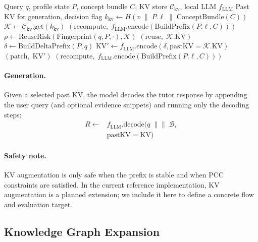 \documentclass[11pt,a4paper,twocolumn]{article}
\begin{document}
\begin{algorithm}[h]
\caption{KVReuseOrRecompute (Proposed)}
\label{alg:kv_reuse}
\footnotesize
\begin{algorithmic}[1]
\REQUIRE Query $q$, profile state $P$, concept bundle $C$, KV store $\mathcal{C}_{\text{kv}}$, local LLM $f_{\text{LLM}}$
\ENSURE Past KV for generation, decision flag
\STATE $k_{\text{kv}} \leftarrow H(v \;\|\; P.\ell \;\|\; \text{ConceptBundle}(C))$
\STATE $\mathcal{K} \leftarrow \mathcal{C}_{\text{kv}}.\text{get}(k_{\text{kv}})$
  \RETURN $(\text{recompute},\; f_{\text{LLM}}.\text{encode}(\text{BuildPrefix}(P.\ell, C)))$
\ENDIF
\STATE $\rho \leftarrow \text{ReuseRisk}(\text{Fingerprint}(q,P,\cdot), \mathcal{K})$
  \RETURN $(\text{reuse},\; \mathcal{K}.\text{KV})$
  \STATE $\delta \leftarrow \text{BuildDeltaPrefix}(P, q)$ 
  \STATE $\text{KV}' \leftarrow f_{\text{LLM}}.\text{encode}(\delta, \text{pastKV}=\mathcal{K}.\text{KV})$
  \RETURN $(\text{patch},\; \text{KV}')$
\ELSE
  \RETURN $(\text{recompute},\; f_{\text{LLM}}.\text{encode}(\text{BuildPrefix}(P.\ell, C)))$
\ENDIF
\end{algorithmic}
\end{algorithm}

\paragraph{Generation.} Given a selected past KV, the model decodes the tutor response by appending the user query (and optional evidence snippets) and running only the decoding steps:
\begin{equation}
\begin{aligned}
R \leftarrow{}& f_{\text{LLM}}.\text{decode}(q \;\|\|\; \mathcal{B}, \\
& \text{pastKV}=\text{KV})
\end{aligned}
\end{equation}

\paragraph{Safety note.} KV augmentation is only safe when the prefix is stable and when PCC constraints are satisfied. In the current reference implementation, KV augmentation is a planned extension; we include it here to define a concrete flow and evaluation target.

\subsection{Knowledge Graph Expansion}
\end{document}
